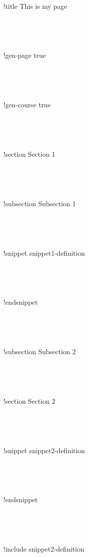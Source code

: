 \documentclass[preview]{standalone}
\begin{document}
~\par\noindent

!title This is my page

~\par
~\par\noindent

!gen-page true

~\par
~\par\noindent

!gen-course true

~\par
~\par\noindent

!section Section 1

~\par
~\par\noindent

!subsection Subsection 1

~\par
~\par\noindent

!snippet snippet1-definition

~\par


~\par\noindent

!endsnippet

~\par
~\par\noindent

!subsection Subsection 2

~\par
~\par\noindent

!section Section 2

~\par
~\par\noindent

!snippet snippet2-definition

~\par


~\par\noindent

!endsnippet

~\par
~\par\noindent

!include snippet2-definition

~\par
\end{document}
